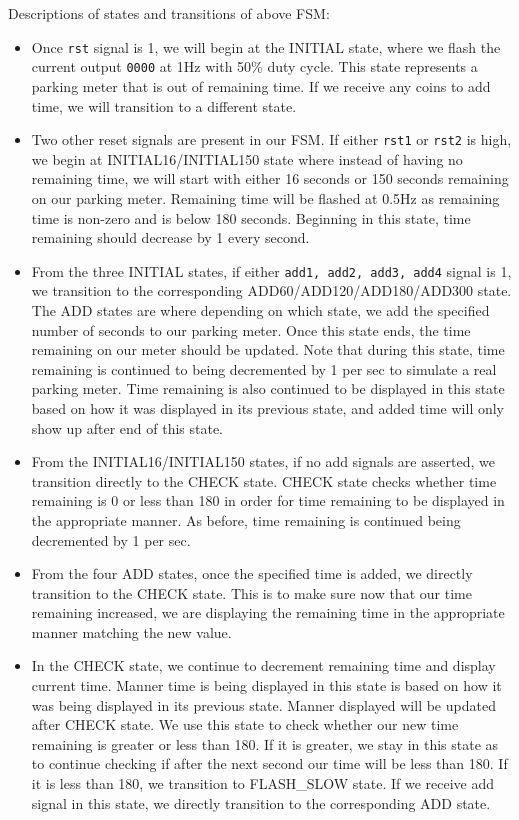 \documentclass{article}
\begin{document}
Descriptions of states and transitions of above FSM:
\begin{itemize}
    \item Once \texttt{rst} signal is 1, we will begin at the INITIAL state, where we flash the current output \texttt{0000} at 1Hz with 50\% duty cycle. This state represents a parking meter that is out of remaining time. If we receive any coins to add time, we will transition to a different state.
    \item Two other reset signals are present in our FSM. If either \texttt{rst1} or \texttt{rst2} is high, we begin at INITIAL16/INITIAL150 state where instead of having no remaining time, we will start with either 16 seconds or 150 seconds remaining on our parking meter. Remaining time will be flashed at 0.5Hz as remaining time is non-zero and is below 180 seconds. Beginning in this state, time remaining should decrease by 1 every second. 
    \item From the three INITIAL states, if either \texttt{add1, add2, add3, add4} signal is 1, we transition to the corresponding ADD60/ADD120/ADD180/ADD300 state. The ADD states are where depending on which state, we add the specified number of seconds to our parking meter. Once this state ends, the time remaining on our meter should be updated. Note that during this state, time remaining is continued to being decremented by 1 per sec to simulate a real parking meter. Time remaining is also continued to be displayed in this state based on how it was displayed in its previous state, and added time will only show up after end of this state.
    \item From the INITIAL16/INITIAL150 states, if no add signals are asserted, we transition directly to the CHECK state. CHECK state checks whether time remaining is 0 or less than 180 in order for time remaining to be displayed in the appropriate manner. As before, time remaining is continued being decremented by 1 per sec. 
    \item From the four ADD states, once the specified time is added, we directly transition to the CHECK state. This is to make sure now that our time remaining increased, we are displaying the remaining time in the appropriate manner matching the new value. 
    \item In the CHECK state, we continue to decrement remaining time and display current time. Manner time is being displayed in this state is based on how it was being displayed in its previous state. Manner displayed will be updated after CHECK state. We use this state to check whether our new time remaining is greater or less than 180. If it is greater, we stay in this state as to continue checking if after the next second our time will be less than 180. If it is less than 180, we transition to FLASH\_SLOW state. If we receive add signal in this state, we directly transition to the corresponding ADD state.

\end{itemize}
\end{document}
